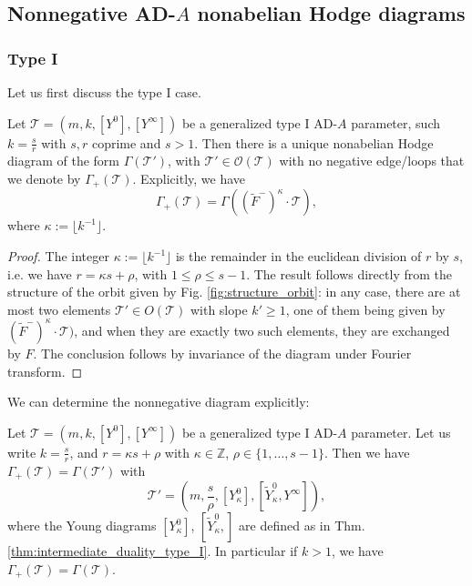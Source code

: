 \documentclass[11pt,a4paper]{amsart}
\numberwithin{equation}{section}
\begin{document}
\subsection{Nonnegative AD-$A$ nonabelian Hodge diagrams}

\subsubsection{Type I} Let us first discuss the type I case.

\begin{proposition}
\label{prop:nonnegative_diagram_type_I}
Let $\mathcal T=(m,k, [Y^0], [Y^\infty])$ be a generalized type I AD-$A$ parameter, such $k=\frac{s}{r}$ with $s,r$ coprime and $s>1$. Then there is a unique nonabelian Hodge  diagram of the form $\Gamma(\mathcal T')$, with $\mathcal T' \in \mathcal O(\mathcal T)$ with no negative edge/loops that we denote by $\Gamma_+(\mathcal T)$. Explicitly, we have
\[
\Gamma_+(\mathcal T)=
\Gamma((\widetilde{F}^-)^\kappa\cdot \mathcal T),
\]
where $\kappa:=\lfloor k^{-1}\rfloor$.
\end{proposition}


\begin{proof}
The integer $\kappa:=\lfloor k^{-1}\rfloor$ is the remainder in the euclidean division of $r$ by $s$, i.e. we have $r=\kappa s+\rho$, with $1\leq \rho\leq s-1$. The result follows directly from the structure of the orbit given by Fig. \ref{fig:structure_orbit}: in any case, there are at most two elements $\mathcal T'\in O(\mathcal T)$ with slope $k'\geq 1$, one of them being given by $(\widetilde{F}^-)^\kappa\cdot \mathcal T)$, and when they are exactly two such elements, they are exchanged by $F$. The conclusion follows by invariance of the diagram under Fourier transform.
\end{proof}

We can determine the nonnegative diagram explicitly:

\begin{proposition}
\label{prop:explicit_nonnegative_diagram_type_I}
Let $\mathcal T=(m,k,[Y^0], [Y^\infty])$ be a generalized type I AD-$A$ parameter. Let us write $k=\frac{s}{r}$, and $r=\kappa s+\rho$ with $\kappa\in \mathbb Z$, $\rho\in \{1, \dots, s-1\}$. Then we have $\Gamma_+(\mathscr T)=\Gamma(\mathcal T')$ with
\[
\mathcal T'=\left(m, \frac{s}{\rho}, [Y^0_\kappa], [\widetilde Y^0_\kappa, Y^\infty]\right),
\]
where the Young diagrams $[Y^0_\kappa]$, $[\widetilde Y^0_\kappa, ]$ are defined as in Thm. \ref{thm:intermediate_duality_type_I}. In particular if $k>1$, we have $\Gamma_+(\mathcal T)=\Gamma(\mathcal T)$.
\end{proposition}
\end{document}
